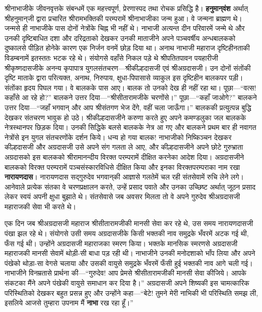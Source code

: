 \begin{sloppypar}\justifying{}
श्रीनाभाजीके जीवनवृत्तके संबन्धमें एक महत्त्वपूर्ण, प्रेरणास्पद तथा रोचक प्रसिद्धि है। \textbf{हनुमान्‌वंश} अर्थात् श्रीहनुमान्‌जी द्वारा प्रचारित श्रीरामभक्तिकी परम्परामें श्रीनाभाजीका जन्म हुआ। वे जन्मना ब्राह्मण थे। जन्मसे ही नाभाजीके पास दोनों नेत्रोंके चिह्न भी नहीं थे। नाभाजी अत्यन्त दीन परिवारमें जन्मे थे और उनकी दृष्टिबाधित दशा और दरिद्रताको देखकर उनकी माताजीने अपने पञ्चवर्षीय अन्धबालकको दुष्कालसे पीड़ित होनेके कारण एक निर्जन वनमें छोड़ दिया था। अनाथ नाभाजी महाराज दृष्टिहीनताकी विडम्बनामें इतस्ततः भटक रहे थे। संयोगसे वहाँसे निकल पड़े थे श्रीपतितपावन पयहारीजी श्रीकृष्णदासजीके अनन्य कृपापात्र युगलसंतचरण—श्रीकील्हदासजी एवं श्रीअग्रदासजी। उन दोनों संतोंकी दृष्टि माताके द्वारा परित्यक्त, अनाथ, निरुपाय, क्षुधा-पिपासासे व्याकुल इस दृष्टिहीन बालकपर पड़ी। संतोंका हृदय पिघल गया। वे बालकके पास आए। बालक तो उनको देख ही नहीं रहा था। पूछा—“वत्स! कहाँसे आ रहे हो?” बालकने उत्तर दिया—“श्रीसीतारामजीके चरणोंसे।” पूछा—“कहाँ जाओगे?” बालकने उत्तर दिया—“जहाँ भगवान् और आप श्रीसंतगण भेज देंगे, वहीं चला जाऊँगा।” बालककी प्रत्युत्पन्न बुद्धि देखकर संतचरण भावुक हो उठे। श्रीकील्हदासजीने करुणा करते हुए अपने कमण्डलुका जल बालकके नेत्रस्थानपर छिड़क दिया। उनकी सिद्धिके बलसे बालकके नेत्र आ गए और बालकने प्रथम बार ही नवागत नेत्रोंसे इन युगल संत\-चरणोंके दर्शन किये। धन्य हो गया बालक! नाभाजीको निष्किञ्चन देखकर कील्हदासजी और अग्रदासजी उसे अपने संग गलता ले आए, और कील्हदासजीने अपने छोटे गुरुभ्राता अग्रदासको इस बालकको श्रीरामानन्दीय विरक्त परम्परामें दीक्षित करनेका आदेश दिया। अग्रदासजीने बालकको विरक्त परम्परामें पञ्चसंस्कारविधिसे दीक्षित किया और इनका विरक्तपरम्पराका नाम रखा \textbf{नारायणदास}। नारायणदास सद्गुरुदेव भगवान्‌की आज्ञासे गलतेमें चल रही संतसेवामें रुचि लेने लगे। आनेवाले प्रत्येक संतका वे चरण\-प्रक्षालन करते, उन्हें प्रसाद पवाते और उनका उच्छिष्ट अर्थात् जूठन प्रसाद लेकर स्वयं अपनी क्षुधा बुझाते थे। संत\-सेवासे जब अवसर मिलता तो वे अपने गुरुदेव श्रीअग्रदासजी महाराजकी सेवा भी करते थे।
\end{sloppypar}
\begin{sloppypar}\justifying{}
एक दिन जब श्रीअग्रदासजी महाराज श्रीसीतारामजीकी मानसी सेवा कर रहे थे, उस समय नारायणदासजी पंखा झल रहे थे। संयोगसे उसी समय अग्रदासजीके किसी भक्तकी नाव समुद्रके भँवरमें अटक गई थी, फँस गई थी। उन्होंने अग्रदासजी महाराजका स्मरण किया। भक्तके मानसिक स्मरणसे अग्रदासजी महाराजकी मानसी सेवामें थोड़ी-सी बाधा पड़ रही थी। नाभाजीने उनकी मनोदशाको भाँप लिया और अपने पंखेको थोड़ा-सा वेगसे चलाया और उसकी वायुसे समुद्रके भँवरमें फँसी हुई भक्तकी नाव आगे चली गई। नाभाजीने विनम्रतासे प्रार्थना की—“गुरुदेव! आप प्रेमसे श्रीसीतारामजीकी मानसी सेवा कीजिये। आपके संकटका मैंने अपने पंखेकी वायुसे समाधान कर दिया है।” अग्रदासजी अपने शिष्यकी इस चामत्कारिक परिस्थितिको देखकर बहुत प्रसन्न हुए और उन्होंने कहा—“बेटे! तुमने मेरी नाभिकी भी परिस्थिति समझ ली, इसलिये आजसे तुम्हारा उपनाम मैं \textbf{नाभा} रख रहा हूँ।”
\end{sloppypar}
